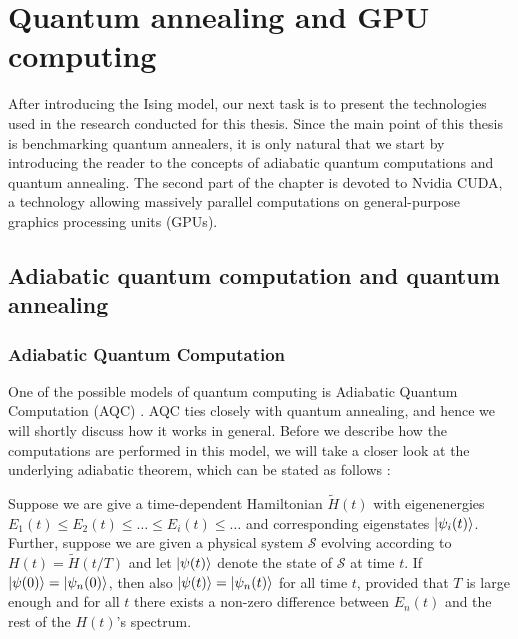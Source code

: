 \chapter{Quantum annealing and GPU computing}
\label{chapter:near-term}

After introducing the Ising model, our next task is to present the technologies
used in the research conducted for this thesis. Since the main point of this
thesis is benchmarking quantum annealers, it is only natural that we start by
introducing the reader to the concepts of adiabatic quantum computations and
quantum annealing. The second part of the chapter is devoted to Nvidia CUDA, a
technology allowing massively parallel computations on general-purpose graphics
processing units (GPUs).

\section{Adiabatic quantum computation and quantum annealing}

\subsection{Adiabatic Quantum Computation}
One of the possible models of quantum computing is Adiabatic Quantum
Computation (AQC) \cite{farhi}. AQC ties closely with quantum annealing, and
hence we will shortly discuss how it works in general. Before we describe how
the computations are performed in this model, we will take a closer look at the
underlying adiabatic theorem, which can be stated as follows \cite{farhi,
  born}:

\begin{theorem}
  Suppose we are give a time-dependent Hamiltonian $\tilde{H}(t)$ with
  eigenenergies $E_1(t) \le E_2(t) \le \ldots \le E_i(t) \le \ldots$ and
  corresponding eigenstates $\ket{\psi_i(t)}$. Further, suppose we are given a
  physical system $\mathcal{S}$ evolving according to $H(t) = \tilde{H}(t/T)$ and
  let $\ket{\psi(t)}$ denote the state of $\mathcal{S}$ at time $t$. If
  $\ket{\psi(0)} = \ket{\psi_n(0)}$, then also $\ket{\psi(t)} = \ket{\psi_n(t)}$
  for all time $t$, provided that $T$ is large enough and for all $t$ there
  exists a non-zero difference between $E_n(t)$ and the rest of the $H(t)$'s
  spectrum.
\end{theorem}

